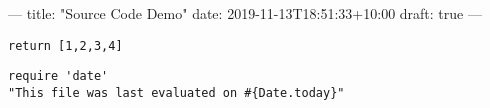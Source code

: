 \documentclass[11pt]{article}
\author{Zhibin Huang}
\date{\today}
\title{}
\begin{document}
\tableofcontents

---
title: "Source Code Demo"
date: 2019-11-13T18:51:33+10:00
draft: true
---

\begin{verbatim}
return [1,2,3,4]
\end{verbatim}

\begin{verbatim}
require 'date'
"This file was last evaluated on #{Date.today}"
\end{verbatim}
\end{document}
